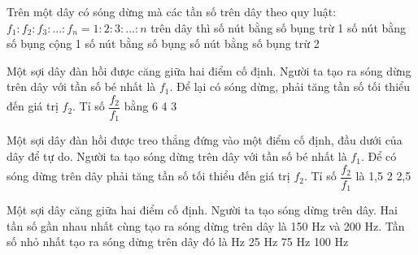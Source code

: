 \setcounter{paragraph}{0}
\setcounter{ex}{0}
\PhanI
{}
\begin{ex}%
Trên một dây có sóng dừng mà các tần số trên dây theo quy luật: $f_1:f_2:f_3:...:f_n=1:2:3:...:n$ trên dây thì
\choice
{số nút bằng số bụng trừ 1}
{\True số nút bằng số bụng cộng 1}
{số nút bằng số bụng}
{số nút bằng số bụng trừ 2}
\end{ex} 
\begin{ex}%
Một sợi dây đàn hồi được căng giữa hai điểm cố định. Người ta tạo ra sóng dừng trên dây với tần số bé nhất là $f_1$. Để lại có sóng dừng, phải tăng tần số tối thiểu đến giá trị $f_2$. Tỉ số $\dfrac{f_2}{f_1}$ bằng
\choice
{6}
{4}
{}
{3}
\end{ex} 
\begin{ex}%
Một sợi dây đàn hồi được treo thẳng đứng vào một điểm cố định, đầu dưới của dây để tự do. Người ta tạo sóng dừng trên dây với tần số bé nhất là $f_1$. Để có sóng dừng trên dây phải tăng tần số tối thiểu đến giá trị $f_2$. Tỉ số $\dfrac{f_2}{f_1}$ là
\choice
{1,5}
{2}
{2,5}
{}
\end{ex} 
\begin{ex}%
Một sợi dây căng giữa hai điểm cố định. Người ta tạo sóng dừng trên dây. Hai tần số gần nhau nhất cùng tạo ra sóng dừng trên dây là 150 Hz và 200 Hz. Tần số nhỏ nhất tạo ra sóng dừng trên dây đó là
\choice
{ Hz}
{25 Hz}
{75 Hz}
{100 Hz}
\end{ex} 
